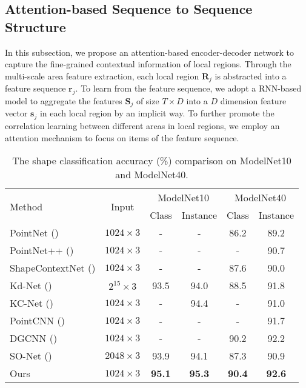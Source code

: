 \documentclass[letterpaper]{article}
\begin{document}
\subsection{Attention-based Sequence to Sequence Structure}
In this subsection, we propose an attention-based encoder-decoder network to capture the fine-grained contextual information of local regions.
Through the multi-scale area feature extraction, each local region $\bm{R}_j$ is abstracted into a feature sequence $\bm{r}_j$. 
To learn from the feature sequence, we adopt a RNN-based model to aggregate the features $\bm{S}_j$ of size $T \times D$ into a $D$ dimension feature vector $\bm{s}_j$ in each local region by an implicit way. 
To further promote the correlation learning between different areas in local regions, we employ an attention mechanism to focus on items of the feature sequence.
\begin{table*}[htp]
\centering
\caption{The shape classification accuracy (\%) comparison on ModelNet10 and ModelNet40.}
\label{table:compare}
\begin{tabular}{l|c|cc|cc}
\hline 
\multirow{2}{*}{Method}&
\multicolumn{1}{c|}{\multirow{2}{*}{Input}} & 
	\multicolumn{2}{c|}{ModelNet10} &
	\multicolumn{2}{c}{ModelNet40} \\ 
& \multicolumn{1}{c|}{}
    & \multicolumn{1}{c}{Class}
    & \multicolumn{1}{c|}{Instance}
    & \multicolumn{1}{c}{Class}
    & \multicolumn{1}{c}{Instance} \\ \hline
 PointNet (\citealt{qi2017pointnet})    				          &$1024 \times 3  $ &-     &-    &86.2 &89.2 \\ 
 PointNet++ (\citealt{qi2017pointnet++})				          &$1024 \times 3  $ &-     &-    &-    &90.7 \\ 
 ShapeContextNet (\citealt{xie2018attentional})					  &$1024 \times 3  $ &-		&-	  &87.6	&90.0 \\
 Kd-Net (\citealt{klokov2017escape})    				          &$2^{15} \times 3$ &93.5  &94.0 &88.5 &91.8 \\ 
KC-Net (\citealt{shen2018mining})  				          &$1024 \times 3$   &-     &94.4 &-    &91.0 \\ 
 PointCNN (\citealt{li2018pointcnn})    				        &$1024 \times 3$   &-     &-    &-    &91.7 \\ 
 DGCNN (\citealt{wang2018dynamic})      			         &$1024 \times 3$   &-     &-    &90.2 &92.2 \\
SO-Net (\citealt{li2018so})            				          &$2048 \times 3$   &93.9  &94.1 &87.3 &90.9 \\ \hline
 Ours                               				          &$1024 \times 3$   &\textbf{95.1}  &\textbf{95.3} &\textbf{90.4} &\textbf{92.6} \\
\hline\end{tabular}
\end{table*}
\end{document}
